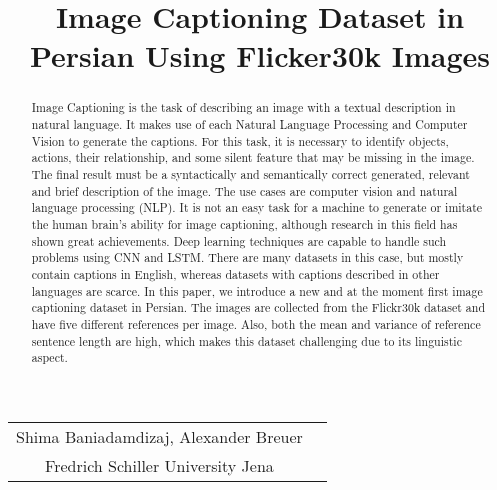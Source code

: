 \documentclass[10pt]{cai}
\begin{document}
\begin{center}

  \title{Image Captioning Dataset in Persian Using Flicker30k Images}
  \maketitle

  \thispagestyle{empty}

  \begin{tabular}{cc}
    Shima Baniadamdizaj\upstairs{\affilone}, Alexander Breuer\upstairs{\affilone}
   \\[0.25ex]
   {\small \upstairs{\affilone} Fredrich Schiller University Jena} \\
  \end{tabular}
  
  \vspace*{0.2in}
\end{center}

\begin{abstract}
  Image Captioning is the task of describing an image with a textual description in natural language. 
  It makes use of each Natural Language Processing and Computer Vision to generate the captions. 
  For this task, it is necessary to identify objects, actions, their relationship, and some silent feature that may be missing in the image.
  The final result must be a syntactically and semantically correct generated, relevant and brief description of the image.
  The use cases are computer vision and natural language processing (NLP). 
  It is not an easy task for a machine to generate or imitate the human brain's ability for image captioning, although research in this field has shown great achievements. 
  Deep learning techniques are capable to handle such problems using CNN and LSTM. There are many datasets in this case, but mostly contain captions in English, whereas datasets with captions described in other languages are scarce. 
  In this paper, we introduce a new and at the moment first image captioning dataset in Persian. 
  The images are collected from the Flickr30k dataset and have five different references per image. 
  Also, both the mean and variance of reference sentence length are high, which makes this dataset challenging due to its linguistic aspect. \\
\end{abstract}
\end{document}
